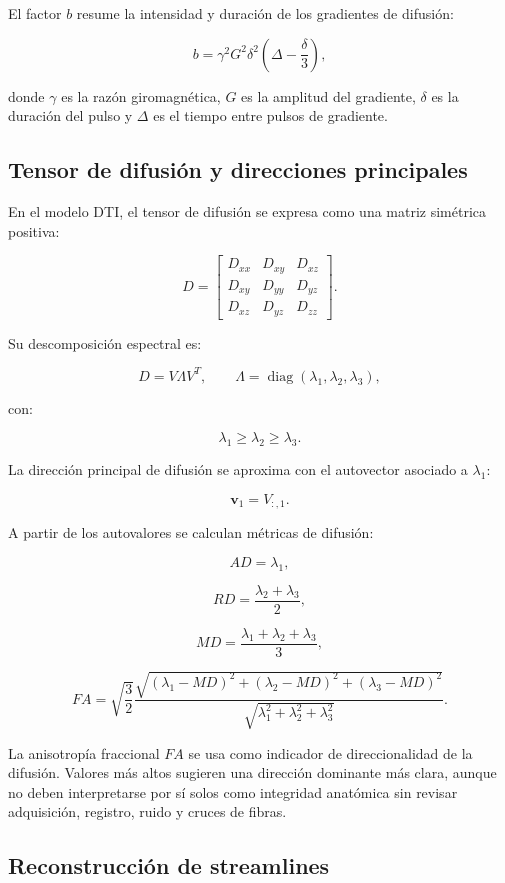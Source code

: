 \documentclass[12pt,a4paper]{article}
\begin{document}
El factor $b$ resume la intensidad y duración de los gradientes de difusión:

\[
b = \gamma^2G^2\delta^2\left(\Delta-\frac{\delta}{3}\right),
\]

donde $\gamma$ es la razón giromagnética, $G$ es la amplitud del gradiente, $\delta$ es la duración del pulso y $\Delta$ es el tiempo entre pulsos de gradiente.

\subsection{Tensor de difusión y direcciones principales}

En el modelo DTI, el tensor de difusión se expresa como una matriz simétrica positiva:

\[
D=
\begin{bmatrix}
D_{xx} & D_{xy} & D_{xz}\\
D_{xy} & D_{yy} & D_{yz}\\
D_{xz} & D_{yz} & D_{zz}
\end{bmatrix}.
\]

Su descomposición espectral es:

\[
D = V\Lambda V^T,
\qquad
\Lambda=\operatorname{diag}(\lambda_1,\lambda_2,\lambda_3),
\]

con:

\[
\lambda_1\geq \lambda_2\geq \lambda_3.
\]

La dirección principal de difusión se aproxima con el autovector asociado a $\lambda_1$:

\[
\mathbf{v}_1 = V_{:,1}.
\]

A partir de los autovalores se calculan métricas de difusión:

\[
AD = \lambda_1,
\]

\[
RD = \frac{\lambda_2+\lambda_3}{2},
\]

\[
MD = \frac{\lambda_1+\lambda_2+\lambda_3}{3},
\]

\[
FA =
\sqrt{\frac{3}{2}}
\frac{
\sqrt{(\lambda_1-MD)^2+(\lambda_2-MD)^2+(\lambda_3-MD)^2}
}
{
\sqrt{\lambda_1^2+\lambda_2^2+\lambda_3^2}
}.
\]

La anisotropía fraccional $FA$ se usa como indicador de direccionalidad de la difusión. Valores más altos sugieren una dirección dominante más clara, aunque no deben interpretarse por sí solos como integridad anatómica sin revisar adquisición, registro, ruido y cruces de fibras.

\subsection{Reconstrucción de streamlines}
\end{document}
